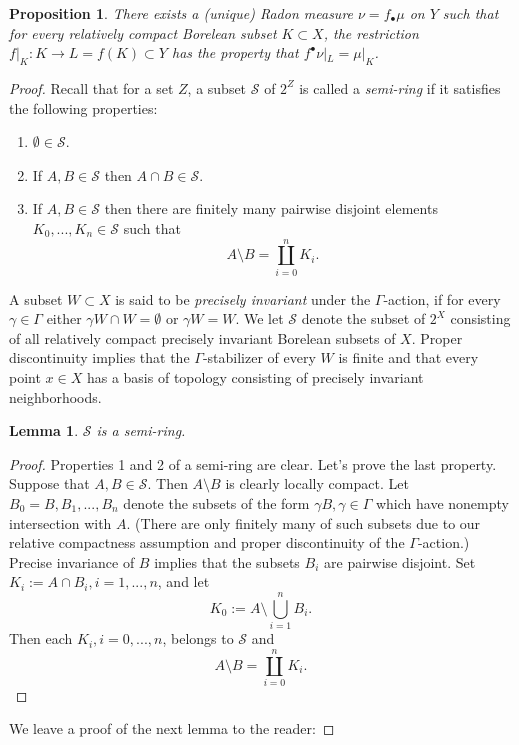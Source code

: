 \documentclass[12pt]{amsbook}%
\newtheorem{lem}[thm]{Lemma}
\newtheorem{prop}[thm]{Proposition}
\theoremstyle{definition}
\theoremstyle{remark}
\numberwithin{section}{chapter}
\numberwithin{subsection}{section}
\numberwithin{figure}{chapter}
\def\cS{{\mathscr{S}}}
\def\Ga{\Gamma}
\def\ga{\gamma}
\begin{document}
{{\begin{prop}
There exists a (unique) Radon measure $\nu=f_\bullet \mu$ on $Y$ such that for every relatively compact Borelean subset $K\subset X$, the restriction 
$f|_K: K\to L=f(K)\subset Y$ has the property that $f^\bullet \nu|_L= \mu|_K$. 
\end{prop}
\begin{proof} Recall that for a set $Z$, a subset $\cS$ of $2^Z$ is called a {\em semi-ring}  if it satisfies the following properties:

\begin{enumerate}
\item $\emptyset \in \cS$. 

\item If $A, B\in \cS$ then $A\cap B\in \cS$. 

\item If $A, B\in \cS$ then there are finitely many pairwise disjoint elements $K_0,...,K_n\in \cS$ such that
$$
A\setminus B= \coprod_{i=0}^n K_i. 
$$
\end{enumerate}

A subset $W\subset X$ is said to be {\em precisely invariant} under the $\Ga$-action, if for every $\ga\in \Ga$ either $\ga W\cap W= \emptyset$ or $\ga W=W$. We let 
$\cS$ denote the subset of $2^X$ consisting of all relatively compact precisely invariant Borelean subsets of $X$. Proper discontinuity implies that the 
$\Ga$-stabilizer of every $W$ is finite and  that every point $x\in X$ has a basis of topology consisting of precisely invariant neighborhoods. 

\begin{lem}
$\cS$ is a semi-ring. 
\end{lem}
\begin{proof} Properties 1 and 2 of a semi-ring are clear. Let's prove the last property. Suppose that $A, B\in \cS$. Then $A\setminus B$ is clearly locally 
compact. Let $B_0=B, B_1,...,B_n$ denote the subsets of the form $\ga B, \ga\in \Ga$ which have nonempty intersection with $A$. (There are only finitely many of such 
subsets due to our relative compactness assumption and proper discontinuity of the $\Ga$-action.) Precise invariance of $B$ implies that the subsets $B_i$ are 
pairwise disjoint.  Set $K_i:= A\cap B_i, i=1,...,n$, and let 
$$
K_0:= A\setminus \bigcup_{i=1}^n B_i. 
$$  
Then each $K_i, i=0,...,n$, belongs to $\cS$ and 
$$
A\setminus B= \coprod_{i=0}^n K_i. 
$$
\end{proof}

We leave a proof of the next lemma to the reader:


\end{proof}}}
\end{document}
